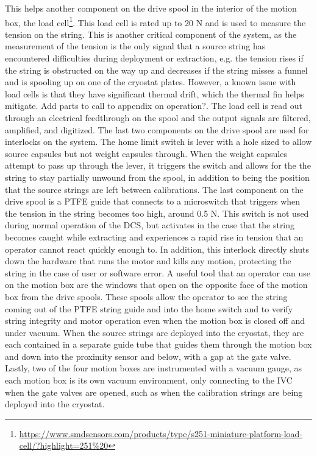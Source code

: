 This helps another component on the drive spool in the interior of the motion box, the load cell\footnote{\url{https://www.smdsensors.com/products/type/s251-miniature-platform-load-cell/?highlight=251\%20}}.
This load cell is rated up to 20 N and is used to measure the tension on the string.
This is another critical component of the system, as the measurement of the tension is the only signal that a source string has encountered difficulties during deployment or extraction, e.g. the tension rises if the string is obstructed on the way up and decreases if the string misses a funnel and is spooling up on one of the cryostat plates.
However, a known issue with load cells is that they have significant thermal drift, which the thermal fin helps mitigate.
\color{red} Add parts to call to appendix on operation?\color{black}.
The load cell is read out through an electrical feedthrough on the spool and the output signals are filtered, amplified, and digitized.
The last two components on the drive spool are used for interlocks on the system.
The home limit switch is lever with a hole sized to allow source capsules but not weight capsules through.
When the weight capsules attempt to pass up through the lever, it triggers the switch and allows for the the string to stay partially unwound from the spool, in addition to being the position that the source strings are left between calibrations.
The last component on the drive spool is a PTFE guide that connects to a microswitch that triggers when the tension in the string becomes too high, around 0.5 N.
This switch is not used during normal operation of the DCS, but activates in the case that the string becomes caught while extracting and experiences a rapid rise in tension that an operator cannot react quickly enough to.
In addition, this interlock directly shuts down the hardware that runs the motor and kills any motion, protecting the string in the case of user or software error.
A useful tool that an operator can use on the motion box are the windows that open on the opposite face of the motion box from the drive spools. These spools allow the operator to see the string coming out of the PTFE string guide and into the home switch and to verify string integrity and motor operation even when the motion box is closed off and under vacuum.
When the source strings are deployed into the cryostat, they are each contained in a separate guide tube that guides them through the motion box and down into the proximity sensor and below, with a gap at the gate valve.
Lastly, two of the four motion boxes are instrumented with a vacuum gauge, as each motion box is its own vacuum environment, only connecting to the IVC when the gate valves are opened, such as when the calibration strings are being deployed into the cryostat.
